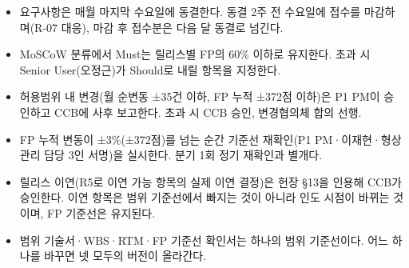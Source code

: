 \documentclass[10pt,a4paper]{article}
\begin{document}
\begin{fieldbox}
\ifwbblank
{}\par\vspace{5mm}
\par\vspace{5mm}
\par\vspace{5mm}
\par\vspace{5mm}
\par\vspace{5mm}
\par
\else
\begin{itemize}
\item 요구사항은 매월 마지막 수요일에 동결한다. 동결 2주 전 수요일에 접수를 마감하며(R-07 대응), 마감 후 접수분은 다음 달 동결로 넘긴다.
\item MoSCoW 분류에서 Must는 릴리스별 FP의 60\% 이하로 유지한다. 초과 시 Senior User(오정근)가 Should로 내릴 항목을 지정한다.
\item 허용범위 내 변경(월 순변동 ±35건 이하, FP 누적 ±372점 이하)은 P1 PM이 승인하고 CCB에 사후 보고한다. 초과 시 CCB 승인, 변경협의체 합의 선행.
\item FP 누적 변동이 ±3\%(±372점)를 넘는 순간 기준선 재확인(P1 PM·이재현·형상관리 담당 3인 서명)을 실시한다. 분기 1회 정기 재확인과 별개다.
\item 릴리스 이연(R5로 이연 가능 항목의 실제 이연 결정)은 헌장 §13을 인용해 CCB가 승인한다. 이연 항목은 범위 기준선에서 빠지는 것이 아니라 인도 시점이 바뀌는 것이며, FP 기준선은 유지된다.
\item 범위 기술서·WBS·RTM·FP 기준선 확인서는 하나의 범위 기준선이다. 어느 하나를 바꾸면 넷 모두의 버전이 올라간다.
\end{itemize}\fi
\end{fieldbox}
\end{document}
